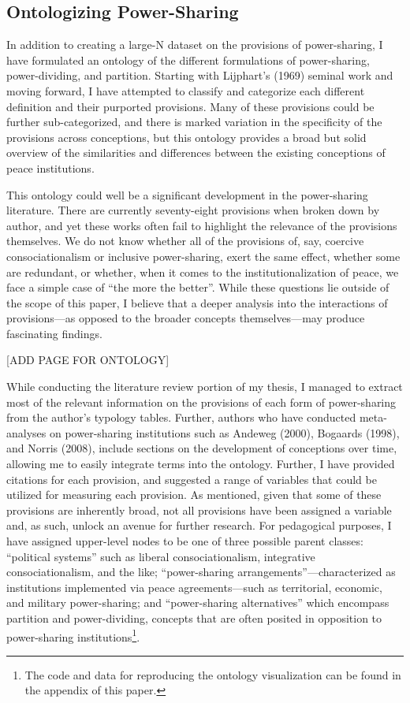 \documentclass[12pt]{article}
\begin{document}
\subsection{Ontologizing Power-Sharing}
In addition to creating a large-N dataset on the provisions of power-sharing, I have formulated an ontology of the different formulations of power-sharing, power-dividing, and partition. Starting with Lijphart’s (1969) seminal work and moving forward, I have attempted to classify and categorize each different definition and their purported provisions. Many of these provisions could be further sub-categorized, and there is marked variation in the specificity of the provisions across conceptions, but this ontology provides a broad but solid overview of the similarities and differences between the existing conceptions of peace institutions.

This ontology could well be a significant development in the power-sharing literature. There are currently seventy-eight provisions when broken down by author, and yet these works often fail to highlight the relevance of the provisions themselves. We do not know whether all of the provisions of, say, coercive consociationalism or inclusive power-sharing, exert the same effect, whether some are redundant, or whether, when it comes to the institutionalization of peace, we face a simple case of “the more the better”. While these questions lie outside of the scope of this paper, I believe that a deeper analysis into the interactions of provisions—as opposed to the broader concepts themselves—may produce fascinating findings. 

[ADD PAGE FOR ONTOLOGY]

While conducting the literature review portion of my thesis, I managed to extract most of the relevant information on the provisions of each form of power-sharing from the author’s typology tables. Further, authors who have conducted meta-analyses on power-sharing institutions such as Andeweg (2000), Bogaards (1998), and Norris (2008), include sections on the development of conceptions over time, allowing me to easily integrate terms into the ontology. Further, I have provided citations for each provision, and suggested a range of variables that could be utilized for measuring each provision. As mentioned, given that some of these provisions are inherently broad, not all provisions have been assigned a variable and, as such, unlock an avenue for further research. For pedagogical purposes, I have assigned upper-level nodes to be one of three possible parent classes: “political systems” such as liberal consociationalism, integrative consociationalism, and the like; “power-sharing arrangements”—characterized as institutions implemented via peace agreements—such as territorial, economic, and military power-sharing; and “power-sharing alternatives” which encompass partition and power-dividing, concepts that are often posited in opposition to power-sharing institutions\footnote{The code and data for reproducing the ontology visualization can be found in the appendix of this paper.}.
\end{document}
